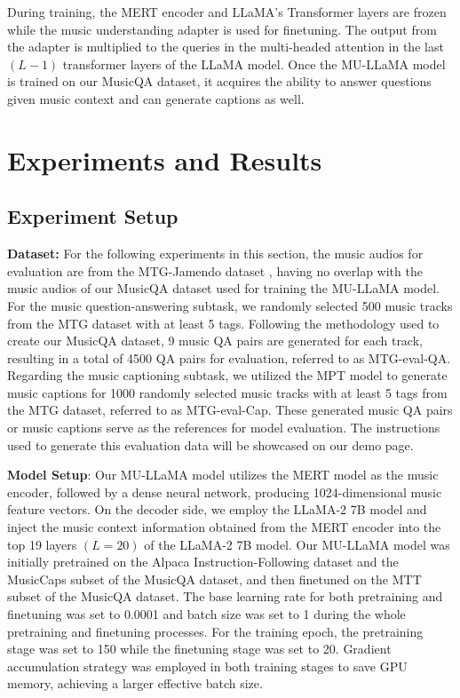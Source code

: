 \documentclass{article}
\begin{document}
During training, the MERT encoder \cite{li2023mert} and LLaMA's \cite{touvron2023llama} Transformer layers are frozen while the music understanding adapter is used for finetuning. The output from the adapter is multiplied to the queries in the multi-headed attention in the last $(L-1)$ transformer layers of the LLaMA model. Once the MU-LLaMA model is trained on our MusicQA dataset, it acquires the ability to answer questions given music context and can generate captions as well.

\vspace{-0.2cm}
\section{Experiments and Results}
\label{sec:experiments}



\subsection{Experiment Setup}

\noindent
\textbf{Dataset:} For the following experiments in this section, the music audios for evaluation are from the MTG-Jamendo dataset \cite{bogdanov2019mtg}, having no overlap with the music audios of our MusicQA dataset used for training the MU-LLaMA model. For the music question-answering subtask, we randomly selected 500 music tracks from the MTG dataset with at least 5 tags. Following the methodology used to create our MusicQA dataset, 9 music QA pairs are generated for each track, resulting in a total of 4500 QA pairs for evaluation, referred to as MTG-eval-QA. Regarding the music captioning subtask, we utilized the MPT model \cite{MosaicML2023Introducing} to generate music captions for 1000 randomly selected music tracks with at least 5 tags from the MTG dataset, referred to as MTG-eval-Cap. These generated music QA pairs or music captions serve as the references for model evaluation. The instructions used to generate this evaluation data will be showcased on our demo page.

\noindent
\textbf{Model Setup}: Our MU-LLaMA model utilizes the MERT model as the music encoder, followed by a dense neural network, producing 1024-dimensional music feature vectors. On the decoder side, we employ the LLaMA-2 7B model \cite{touvron2023llama2} and inject the music context information obtained from the MERT encoder into the top 19 layers $(L = 20)$ of the LLaMA-2 7B model. Our MU-LLaMA model was initially pretrained on the Alpaca Instruction-Following dataset and the MusicCaps subset of the MusicQA dataset, and then finetuned on the MTT subset of the MusicQA dataset. The base learning rate for both pretraining and finetuning was set to 0.0001 and batch size was set to 1 during the whole pretraining and finetuning processes. For the training epoch, the pretraining stage was set to 150 while the finetuning stage was set to 20. Gradient accumulation strategy was employed in both training stages to save GPU memory, achieving a larger effective batch size.
\end{document}
